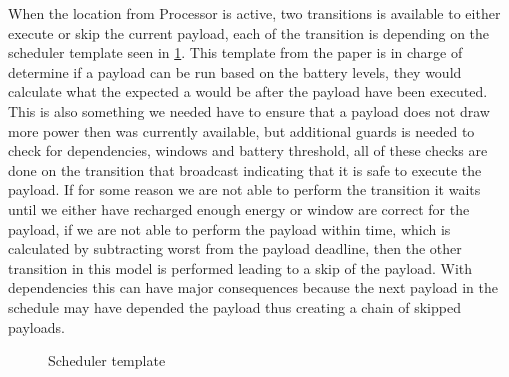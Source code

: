 When the location  from Processor is active, two transitions is available to either execute or skip the current payload, each of the transition is depending on the scheduler template seen in \cref{fig:smc_S}. This template from the paper is in charge of determine if a payload can be run based on the battery levels, they would calculate what the expected a would be after the payload have been executed. This is also something we needed have to ensure that a payload does not draw more power then was currently available, but additional guards is needed to check for dependencies, windows and battery threshold, all of these checks are done on the transition that broadcast  indicating that it is safe to execute the payload. If for some reason we are not able to perform the transition it waits until we either have recharged enough energy or window are correct for the payload, if we are not able to perform the payload within time, which is calculated by subtracting worst from the payload deadline, then the other transition in this model is performed leading to a skip of the payload. With dependencies this can have major consequences because the next payload in the schedule may have depended the payload thus creating a chain of skipped payloads.

\begin{figure}[H]
	\centering
	\caption{Scheduler template}
	\label{fig:smc_S}
\end{figure}

